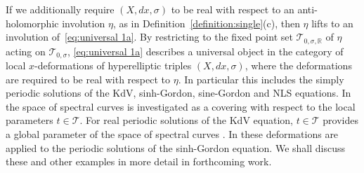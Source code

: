 \documentclass[11pt,twoside]{amsart}
\theoremstyle{plain}
\newcommand{\Tm}{\mathcal{T}}
\newcommand{\dfx}{dx}
\begin{document}
If we additionally require $(X,\dfx,\sigma)$ to be real with respect to an anti-holomorphic involution $\eta$, as in Definition~\ref {definition:single}(c),  then $\eta$ lifts to an involution of~\eqref{eq:universal 1a}. By restricting to the fixed point set $\Tm_{0,\sigma,\mathbb{R}}$ of $\eta$ acting on $\Tm_{0,\sigma}$, \eqref{eq:universal 1a} describes a universal object in the category of local $x$-deformations of hyperelliptic triples $(X,dx,\sigma)$, where the deformations are required to be real with respect to $\eta$. 
In particular this includes the simply periodic solutions of the KdV,  %
sinh-Gordon, sine-Gordon and NLS equations. %
In \cite{G-S-1} the space of spectral curves is investigated as a covering with respect to the local parameters $t\in\Tm$. For real periodic solutions of the KdV equation, $t\in \mathcal{T}$ provides a global parameter of the space of spectral curves \cite{MO:75,Korotyaev:08}.
In \cite{H-K-S-3} these deformations are applied to the periodic solutions of the sinh-Gordon equation. We shall discuss these and other examples in more detail in forthcoming work.


\end{document}
